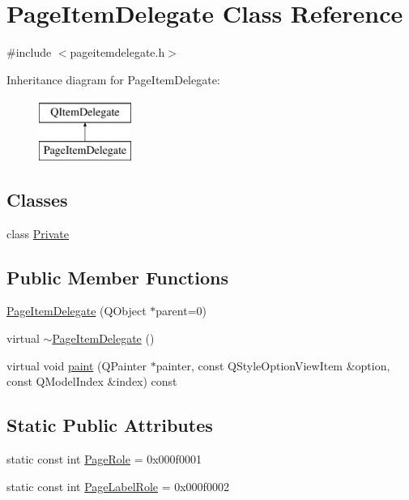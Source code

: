 \hypertarget{classPageItemDelegate}{\section{Page\+Item\+Delegate Class Reference}
\label{classPageItemDelegate}
}


{\ttfamily \#include $<$pageitemdelegate.\+h$>$}

Inheritance diagram for Page\+Item\+Delegate\+:\begin{figure}[H]
\begin{center}
\leavevmode
\includegraphics[height=2.000000cm]{classPageItemDelegate}
\end{center}
\end{figure}
\subsection*{Classes}
\begin{DoxyCompactItemize}
\item 
class \hyperlink{classPageItemDelegate_1_1Private}{Private}
\end{DoxyCompactItemize}
\subsection*{Public Member Functions}
\begin{DoxyCompactItemize}
\item 
\hyperlink{classPageItemDelegate_af4e7efab6bbcc61dc897f6dc5d97e868}{Page\+Item\+Delegate} (Q\+Object $\ast$parent=0)
\item 
virtual \hyperlink{classPageItemDelegate_a577b0516348a33c016dcedbf6b63decb}{$\sim$\+Page\+Item\+Delegate} ()
\item 
virtual void \hyperlink{classPageItemDelegate_a5f31eacfac173ae6e8f85d14efd42508}{paint} (Q\+Painter $\ast$painter, const Q\+Style\+Option\+View\+Item \&option, const Q\+Model\+Index \&index) const 
\end{DoxyCompactItemize}
\subsection*{Static Public Attributes}
\begin{DoxyCompactItemize}
\item 
static const int \hyperlink{classPageItemDelegate_abd76ff54064145a88199c5c60880d91f}{Page\+Role} = 0x000f0001
\item 
static const int \hyperlink{classPageItemDelegate_ac9fbbb47e84f3908d29c1ffa164ba90e}{Page\+Label\+Role} = 0x000f0002
\end{DoxyCompactItemize}
